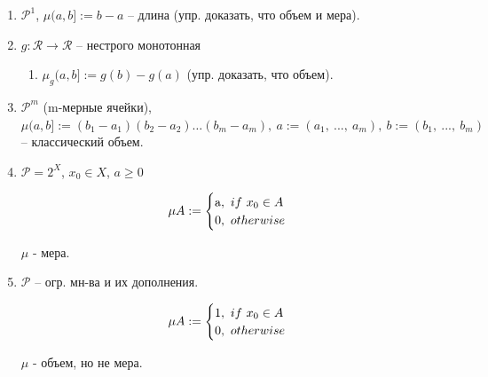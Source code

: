 \begin{example}
    \begin{enumerate}
        \item $\mathcal{P}^1$,   \;\; $\mu (a, b] := b - a$ -- длина (упр. доказать, что объем и мера).
        \item {
            $g: \mathcal{R} \rightarrow \mathcal{R}$ -- нестрого монотонная

            \begin{enumerate}
                \item $\mu_{g}(a, b] := g(b) - g(a)$ (упр. доказать, что объем).
            \end{enumerate}
        }
        \item $\mathcal{P}^m$ (m-мерные ячейки), \;\; $\mu (a, b] := (b_1 - a_1)(b_2 - a_2) \dots (b_m - a_m), \ a := (a_1, \ ..., \ a_m), \ b := (b_1, \ ..., \ b_m)$ -- классический объем.
        \item {
            $\mathcal{P} = 2^X$, \;\; $x_0 \in X$, \;\; $a \geq 0$
            
            \begin{equation}
                \mu A := 
                \begin{cases}
                    $a$, \ if \  x_{0} \in A \\
                    $0$, \ otherwise
                \end{cases}                
            \end{equation}

            $\mu$ - мера.
        }
        \item {
            $\mathcal{P}$ -- огр. мн-ва и их дополнения.
            
            \begin{equation}
                \mu A := 
                \begin{cases}
                    $1$, \ if \  x_{0} \in A \\
                    $0$, \ otherwise
                \end{cases}                
            \end{equation}

            $\mu$ - объем, но не мера.
        }
    \end{enumerate}
\end{example}

